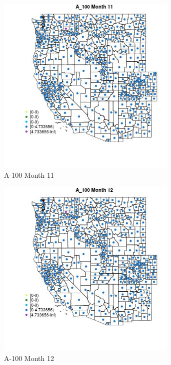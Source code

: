 \begin{figure} 
\centering  
\includegraphics[width=0.77\textwidth]{Code_Outputs/df_report_ML_predictors_CountyCentroid_Locations_Dates_2008-01-01to2018-12-31_MapObsMo11A_100.jpg} 
\caption{\label{fig:df_report_ML_predictors_CountyCentroid_Locations_Dates_2008-01-01to2018-12-31MapObsMo11A_100}A-100 Month 11} 
\end{figure} 
 

\clearpage 

\begin{figure} 
\centering  
\includegraphics[width=0.77\textwidth]{Code_Outputs/df_report_ML_predictors_CountyCentroid_Locations_Dates_2008-01-01to2018-12-31_MapObsMo12A_100.jpg} 
\caption{\label{fig:df_report_ML_predictors_CountyCentroid_Locations_Dates_2008-01-01to2018-12-31MapObsMo12A_100}A-100 Month 12} 
\end{figure} 
 

